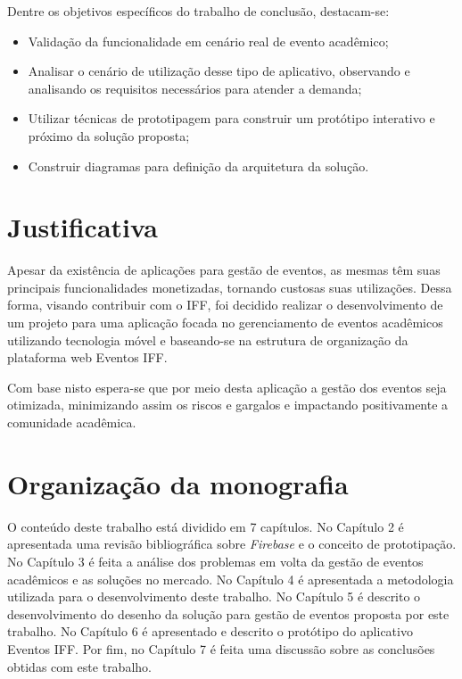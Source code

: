 Dentre os objetivos específicos do trabalho de conclusão, destacam-se:
\begin{itemize}
    \item Validação da funcionalidade em cenário real de evento acadêmico;
    \item Analisar o cenário de utilização desse tipo de aplicativo, observando e analisando os requisitos necessários para atender a demanda;
    \item Utilizar técnicas de prototipagem para construir um protótipo interativo e próximo da solução proposta;
    \item Construir diagramas para definição da arquitetura da solução. 
\end{itemize}

\section{Justificativa}

Apesar da existência de aplicações para gestão de eventos, as mesmas têm suas principais funcionalidades monetizadas, tornando custosas suas utilizações. Dessa forma, visando contribuir com o IFF, foi decidido realizar o desenvolvimento de um projeto para uma aplicação focada no gerenciamento de eventos acadêmicos utilizando tecnologia móvel e baseando-se na estrutura de organização da plataforma web Eventos IFF.

Com base nisto espera-se que por meio desta aplicação a gestão dos eventos seja otimizada, minimizando assim os riscos e gargalos e impactando positivamente a comunidade acadêmica.

\section{Organização da monografia}

O conteúdo deste trabalho está dividido em 7 capítulos. No Capítulo 2 é apresentada uma revisão bibliográfica sobre \textit{Firebase} e o conceito de prototipação. No Capítulo 3 é feita a análise dos problemas em volta da gestão de eventos acadêmicos e as soluções no mercado. No Capítulo 4 é apresentada a metodologia utilizada para o desenvolvimento deste trabalho. No Capítulo 5 é descrito o desenvolvimento do desenho da solução para gestão de eventos proposta por este trabalho. No Capítulo 6 é apresentado e descrito o protótipo do aplicativo Eventos IFF. Por fim, no Capítulo 7 é feita uma discussão sobre as conclusões obtidas com este trabalho.
